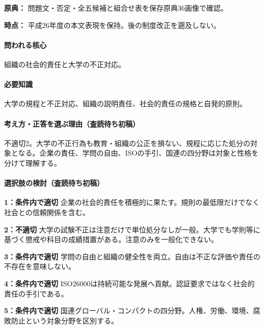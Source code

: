 \noindent\textbf{原典：} 問題文・否定・全五候補と組合せ表を保存原典36画像で確認。\par

\noindent\textbf{時点：} 平成26年度の本文表現を保持。後の制度改正を遡及しない。\par

\paragraph{問われる核心} 組織の社会的責任と大学の不正対応。

\paragraph{必要知識} 大学の規程と不正対応、組織の説明責任、社会的責任の規格と自発的原則。

\paragraph{考え方・正答を選ぶ理由（査読待ち初稿）} 不適切2。大学の不正行為も教育・組織の公正を損ない、規程に応じた処分の対象となる。企業の責任、学問の自由、ISOの手引、国連の四分野は対象と性格を分けて理解する。

\paragraph{選択肢の検討（査読待ち初稿）}\mbox{}\par

\noindent\textbf{1：条件内で適切} 企業の社会的責任を積極的に果たす。規則の最低限だけでなく社会との信頼関係を含む。\par

\noindent\textbf{2：不適切} 大学の試験不正は注意だけで単位処分なしが一般。大学でも学則等に基づく懲戒や科目の成績措置がある。注意のみを一般化できない。\par

\noindent\textbf{3：条件内で適切} 学問の自由と組織の健全性を両立。自由は不正な評価や責任の不存在を意味しない。\par

\noindent\textbf{4：条件内で適切} ISO26000は持続可能な発展へ貢献。認証要求ではなく社会的責任の手引である。\par

\noindent\textbf{5：条件内で適切} 国連グローバル・コンパクトの四分野。人権、労働、環境、腐敗防止という対象分野を区別する。\par


